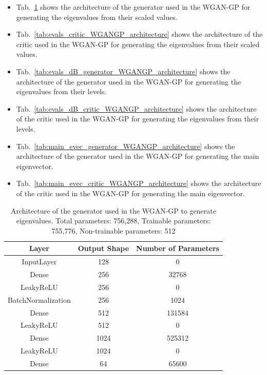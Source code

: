 \documentclass[11pt,a4paper,twoside]{report}
\begin{document}
\begin{itemize}
    \item Tab.~\ref{tab:evals_generator_WGANGP_architecture} shows the architecture of the generator used in the WGAN-GP for generating the eigenvalues from their scaled values.
    \item Tab.~\ref{tab:evals_critic_WGANGP_architecture} shows the architecture of the critic used in the WGAN-GP for generating the eigenvalues from their scaled values.
    \item Tab.~\ref{tab:evals_dB_generator_WGANGP_architecture} shows the architecture of the generator used in the WGAN-GP for generating the eigenvalues from their levels.
    \item Tab.~\ref{tab:evals_dB_critic_WGANGP_architecture} shows the architecture of the critic used in the WGAN-GP for generating the eigenvalues from their levels.
    \item Tab.~\ref{tab:main_evec_generator_WGANGP_architecture} shows the architecture of the generator used in the WGAN-GP for generating the main eigenvector.
    \item Tab.~\ref{tab:main_evec_critic_WGANGP_architecture} shows the architecture of the critic used in the WGAN-GP for generating the main eigenvector.
\end{itemize}


\begin{table}[]
  \centering
  \begin{tabular}{c c c}
      \hline
      \textbf{Layer} & \textbf{Output Shape} & \textbf{Number of Parameters} \\ \hline
      InputLayer            & 128           & 0                 \\ 
      Dense                 & 256           & 32768             \\ 
      LeakyReLU             & 256           & 0                 \\ 
      BatchNormalization    & 256           & 1024              \\ 
      Dense                 & 512           & 131584            \\ 
      LeakyReLU             & 512           & 0                 \\ 
      Dense                 & 1024          & 525312            \\ 
      LeakyReLU             & 1024          & 0                 \\ 
      Dense                 & 64            & 65600             \\ 
      \end{tabular}
  \caption{Architecture of the generator used in the WGAN-GP to generate eigenvalues. Total parameters: 756,288, Trainable parameters: 755,776, Non-trainable parameters: 512}
  \label{tab:evals_generator_WGANGP_architecture}
\end{table}
\end{document}
